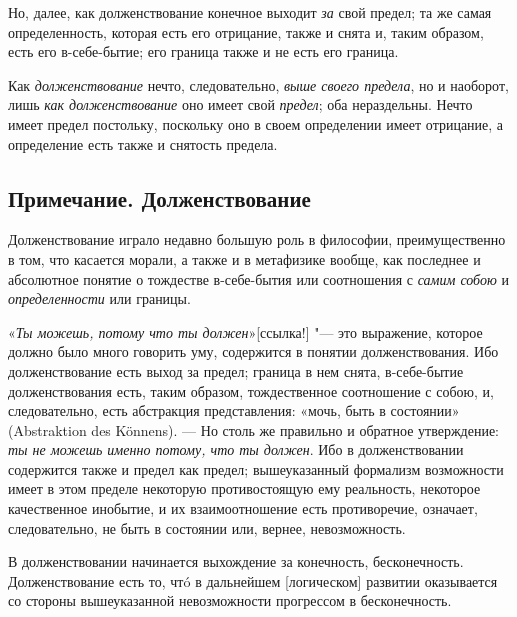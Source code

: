 Но, далее, как долженствование конечное выходит {\em за}
свой предел; та же самая определенность, которая есть его отрицание, также
и снята и, таким образом, есть его в-себе-бытие; его граница также и не
есть его граница.

Как {\em долженствование} нечто, следовательно,
{\em выше своего предела}, но и наоборот, лишь
{\em как долженствование} оно имеет свой
{\em предел}; оба нераздельны. Нечто имеет предел
постольку, поскольку оно в своем определении имеет отрицание, а определение
есть также и снятость предела.

\subsection*{Примечание. Долженствование}

Долженствование играло недавно большую роль в философии, преимущественно в
том, что касается морали, а также и в метафизике вообще, как последнее и
абсолютное понятие о тождестве в-себе-бытия или соотношения с
{\em самим собою} и
{\em определенности} или границы.

«{\em Ты можешь, потому что ты
должен}»[ссылка!] "--- это выражение, которое должно
было много говорить уму, содержится в понятии долженствования. Ибо
долженствование есть выход за предел; граница в нем снята, в-себе-бытие
долженствования есть, таким образом, тождественное соотношение с собою, и,
следовательно, есть абстракция представления: «мочь, быть в состоянии»
(Abstraktion des Könnens). — Но столь же правильно и обратное утверждение:
{\em ты не можешь именно потому, что ты должен}. Ибо в
долженствовании содержится также и предел как предел; вышеуказанный
формализм возможности имеет в этом пределе некоторую противостоящую ему
реальность, некоторое качественное инобытие, и их взаимоотношение есть
противоречие, означает, следовательно, не быть в состоянии или, вернее,
невозможность.

В долженствовании начинается выхождение за конечность, бесконечность.
Долженствование есть то, чтó в дальнейшем [логическом] развитии оказывается
со стороны вышеуказанной невозможности прогрессом в бесконечность.

